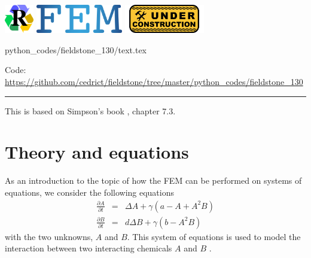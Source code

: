 \includegraphics[height=1.25cm]{images/pictograms/replication}
\includegraphics[height=1.25cm]{images/pictograms/FEM}
\includegraphics[height=1.25cm]{images/pictograms/under_construction}


\begin{flushright} {\tiny {\color{gray} python\_codes/fieldstone\_130/text.tex}} \end{flushright}

%

\begin{center}
\inpython
Code: \url{https://github.com/cedrict/fieldstone/tree/master/python_codes/fieldstone_130}
\end{center}

\par\noindent\rule{\textwidth}{0.4pt}


This is based on Simpson's book \cite{simp17}, chapter 7.3.

\section*{Theory and equations}

As an introduction to the topic of how the FEM can be
performed on systems of equations, we consider the following equations
\begin{eqnarray}
\frac{\partial A}{\partial t} &=& \Delta A  + \gamma (a-A+A^2B) \\
\frac{\partial B}{\partial t} &=& d \Delta B  + \gamma (b-A^2B) 
\end{eqnarray}
with the two unknowns, $A$ and $B$. This system of equations is used to model the interaction between
two interacting chemicals $A$ and $B$ \cite{mawb12}.

